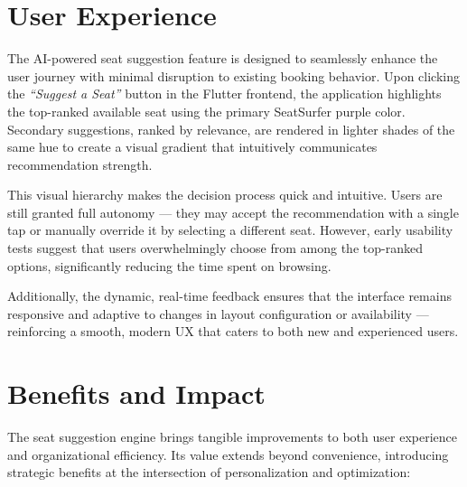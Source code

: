 \documentclass[12pt,a4paper]{report}
\begin{document}
\section{User Experience}

The AI-powered seat suggestion feature is designed to seamlessly enhance the user journey with minimal disruption to existing booking behavior. Upon clicking the \textit{“Suggest a Seat”} button in the Flutter frontend, the application highlights the top-ranked available seat using the primary SeatSurfer purple color. Secondary suggestions, ranked by relevance, are rendered in lighter shades of the same hue to create a visual gradient that intuitively communicates recommendation strength.

This visual hierarchy makes the decision process quick and intuitive. Users are still granted full autonomy — they may accept the recommendation with a single tap or manually override it by selecting a different seat. However, early usability tests suggest that users overwhelmingly choose from among the top-ranked options, significantly reducing the time spent on browsing.

Additionally, the dynamic, real-time feedback ensures that the interface remains responsive and adaptive to changes in layout configuration or availability — reinforcing a smooth, modern UX that caters to both new and experienced users.

\section{Benefits and Impact}

The seat suggestion engine brings tangible improvements to both user experience and organizational efficiency. Its value extends beyond convenience, introducing strategic benefits at the intersection of personalization and optimization:
\end{document}
